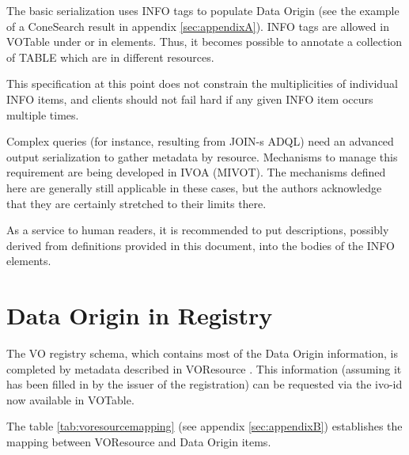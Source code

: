 \documentclass[11pt,a4paper]{ivoa}
\begin{document}
The basic serialization uses INFO tags to populate Data Origin (see the example of a ConeSearch result in appendix  \ref{sec:appendixA}).
INFO tags are allowed in VOTable under  or in  elements.
Thus, it becomes possible to annotate a collection of TABLE which are in different resources.

This specification at this point does not constrain the multiplicities of individual INFO items, and clients should not fail hard if any given INFO item occurs multiple times.

Complex queries (for instance, resulting from JOIN-s ADQL) need an advanced output serialization to gather metadata by resource.
Mechanisms to manage this requirement are being developed in IVOA
(MIVOT).
The mechanisms defined here are generally still applicable in these
cases, but the authors acknowledge that they are certainly stretched to
their limits there.

As a service to human readers, it is recommended to put descriptions, possibly derived from definitions provided in this document, into the bodies of the INFO elements.


\section{Data Origin in Registry}
The VO registry schema, which contains most of the Data Origin information, is completed by metadata described in VOResource \citep{2018ivoa.spec.0625P}.
This information (assuming it has been filled in by the issuer of the registration) can be requested via the ivo-id now available in VOTable.

The table \ref{tab:voresourcemapping} (see appendix \ref{sec:appendixB}) establishes the mapping between VOResource and Data Origin items.

%



\appendix
\end{document}
